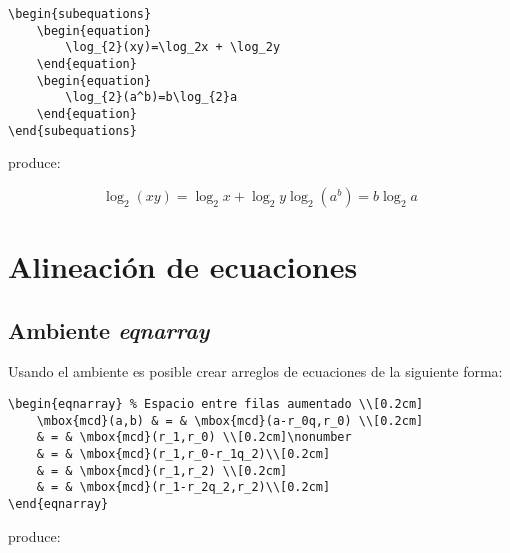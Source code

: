 \documentclass[a4,10pt]{aleph-notas}
\theoremstyle{definition}
\theoremstyle{plain}
\begin{document}
\begin{lstlisting}[frame=single]
\begin{subequations}
    \begin{equation}
        \log_{2}(xy)=\log_2x + \log_2y
    \end{equation}
    \begin{equation}
        \log_{2}(a^b)=b\log_{2}a
    \end{equation}
\end{subequations}
\end{lstlisting}

\noindent
produce:

\begin{subequations}
    \begin{equation}
        \log_{2}(xy)=\log_2x + \log_2y
    \end{equation}
    \begin{equation}
        \log_{2}(a^b)=b\log_{2}a
    \end{equation}
\end{subequations}

\section{Alineación de ecuaciones}

\subsection{Ambiente \emph{eqnarray}}

Usando el ambiente \verb@eqnarray@ es posible crear arreglos de ecuaciones  de la siguiente forma:

\begin{lstlisting}[frame=single]
\begin{eqnarray} % Espacio entre filas aumentado \\[0.2cm]
    \mbox{mcd}(a,b) & = & \mbox{mcd}(a-r_0q,r_0) \\[0.2cm]
    & = & \mbox{mcd}(r_1,r_0) \\[0.2cm]\nonumber
    & = & \mbox{mcd}(r_1,r_0-r_1q_2)\\[0.2cm]
    & = & \mbox{mcd}(r_1,r_2) \\[0.2cm]
    & = & \mbox{mcd}(r_1-r_2q_2,r_2)\\[0.2cm]
\end{eqnarray}
\end{lstlisting}

\noindent
produce:
\end{document}
